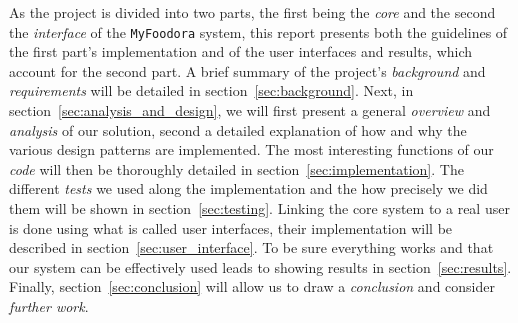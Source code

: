 As the project is divided into two parts, the first being the \emph{core}
and the second the \emph{interface} of the \lstinline|MyFoodora| system,
this report presents both the guidelines of the first part's implementation
and of the user interfaces and results, which account for the second part.
A brief summary of the project's \emph{background} and \emph{requirements} will
be detailed in section~\ref{sec:background}.
Next, in section~\ref{sec:analysis_and_design}, we will first present
a general \emph{overview} and \emph{analysis} of our solution, second a detailed 
explanation of how and why the various design patterns are implemented.
The most interesting functions of our \emph{code} will then be
thoroughly detailed in section~\ref{sec:implementation}.
The different \emph{tests} we used along the implementation
and the how precisely we did them will
be shown in section~\ref{sec:testing}.
Linking the core system to a real user is done using what is called
user interfaces, their implementation will be described
in section~\ref{sec:user_interface}.
To be sure everything works and that our system can be
effectively used leads to showing results in section~\ref{sec:results}.
Finally, section~\ref{sec:conclusion} will allow us to draw 
a \emph{conclusion} and consider \emph{further work}.

